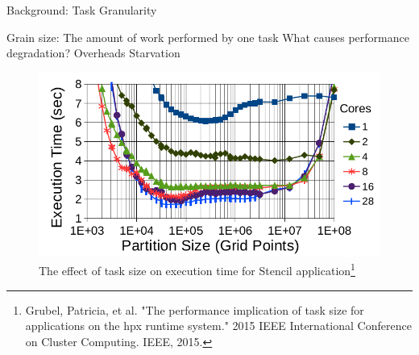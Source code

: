 \documentclass[10pt]{beamer}
\begin{document}
%		

\begin{frame}{Background: Task Granularity}
	\begin{outline}
		Grain size: The amount of work performed by one task
		\1What causes performance degradation?
		\2Overheads
		\2Starvation
		\begin{figure}
			\centering
			\includegraphics[width=0.72\linewidth]{images/task_granularity.png}
			\caption{The effect of task size on execution time for Stencil application\footnote{Grubel, Patricia, et al. "The performance implication of task size for applications on the hpx runtime system." 2015 IEEE International Conference on Cluster Computing. IEEE, 2015.}}	
	
		\end{figure}
		
	\end{outline}
\end{frame}
\end{document}
